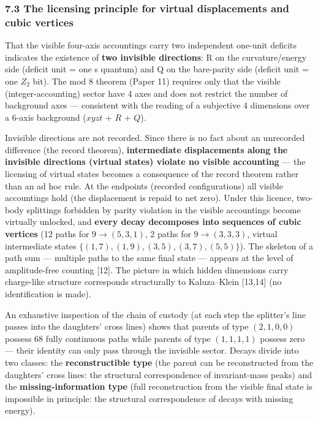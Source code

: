 \documentclass[
]{ltjsarticle}
\begin{document}
\subsubsection{7.3 The licensing principle for virtual displacements and
cubic
vertices}\label{the-licensing-principle-for-virtual-displacements-and-cubic-vertices}

That the visible four-axis accountings carry two independent one-unit
deficits indicates the existence of \textbf{two invisible directions}: R
on the curvature/energy side (deficit unit = one s quantum) and Q on the
bare-parity side (deficit unit = one \(Z_2\) bit). The mod 8 theorem
(Paper 11) requires only that the visible (integer-accounting) sector
have 4 axes and does not restrict the number of background axes ---
consistent with the reading of a subjective 4 dimensions over a 6-axis
background (\(xyzt\) + \(R\) + \(Q\)).

Invisible directions are not recorded. Since there is no fact about an
unrecorded difference (the record theorem), \textbf{intermediate
displacements along the invisible directions (virtual states) violate no
visible accounting} --- the licensing of virtual states becomes a
consequence of the record theorem rather than an ad hoc rule. At the
endpoints (recorded configurations) all visible accountings hold (the
displacement is repaid to net zero). Under this licence, two-body
splittings forbidden by parity violation in the visible accountings
become virtually unlocked, and \textbf{every decay decomposes into
sequences of cubic vertices} (12 paths for \(9\to(5,3,1)\), 2 paths for
\(9\to(3,3,3)\), virtual intermediate states
\(\{(1,7),(1,9),(3,5),(3,7),(5,5)\}\)). The skeleton of a path sum ---
multiple paths to the same final state --- appears at the level of
amplitude-free counting {[}12{]}. The picture in which hidden dimensions
carry charge-like structure corresponds structurally to Kaluza--Klein
{[}13,14{]} (no identification is made).

An exhaustive inspection of the chain of custody (at each step the
splitter's line passes into the daughters' cross lines) shows that
parents of type \((2,1,0,0)\) possess 68 fully continuous paths while
parents of type \((1,1,1,1)\) possess zero --- their identity can only
pass through the invisible sector. Decays divide into two classes: the
\textbf{reconstructible type} (the parent can be reconstructed from the
daughters' cross lines: the structural correspondence of invariant-mass
peaks) and the \textbf{missing-information type} (full reconstruction
from the visible final state is impossible in principle: the structural
correspondence of decays with missing energy).
\end{document}
